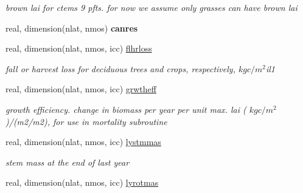 \begin{DoxyCompactItemize}
\begin{DoxyCompactList}\small\item\em brown lai for ctem\textquotesingle{}s 9 pfts. for now we assume only grasses can have brown lai \end{DoxyCompactList}\item 
\hypertarget{structctem__statevars_1_1veg__rot_abd9cd2795117223b9d3d97be030f8e0b}{}real, dimension(nlat, nmos) {\bfseries canres}\label{structctem__statevars_1_1veg__rot_abd9cd2795117223b9d3d97be030f8e0b}

\item 
\hypertarget{structctem__statevars_1_1veg__rot_a691b3864630e729cb3e2b7675c283796}{}real, dimension(nlat, nmos, icc) \hyperlink{structctem__statevars_1_1veg__rot_a691b3864630e729cb3e2b7675c283796}{flhrloss}\label{structctem__statevars_1_1veg__rot_a691b3864630e729cb3e2b7675c283796}

\begin{DoxyCompactList}\small\item\em fall or harvest loss for deciduous trees and crops, respectively, $kg c/m^2$il1 \end{DoxyCompactList}\item 
\hypertarget{structctem__statevars_1_1veg__rot_a65c8792a7c6ae4f66f2c7ceca24e4ada}{}real, dimension(nlat, nmos, icc) \hyperlink{structctem__statevars_1_1veg__rot_a65c8792a7c6ae4f66f2c7ceca24e4ada}{grwtheff}\label{structctem__statevars_1_1veg__rot_a65c8792a7c6ae4f66f2c7ceca24e4ada}

\begin{DoxyCompactList}\small\item\em growth efficiency. change in biomass per year per unit max. lai ( $kg c/m^2$)/(m2/m2), for use in mortality subroutine \end{DoxyCompactList}\item 
\hypertarget{structctem__statevars_1_1veg__rot_a01ef55090edca062f3c113e28af87250}{}real, dimension(nlat, nmos, icc) \hyperlink{structctem__statevars_1_1veg__rot_a01ef55090edca062f3c113e28af87250}{lystmmas}\label{structctem__statevars_1_1veg__rot_a01ef55090edca062f3c113e28af87250}

\begin{DoxyCompactList}\small\item\em stem mass at the end of last year \end{DoxyCompactList}\item 
\hypertarget{structctem__statevars_1_1veg__rot_a00b8b83ddfdbc8cbd74dd36aec8191ea}{}real, dimension(nlat, nmos, icc) \hyperlink{structctem__statevars_1_1veg__rot_a00b8b83ddfdbc8cbd74dd36aec8191ea}{lyrotmas}\label{structctem__statevars_1_1veg__rot_a00b8b83ddfdbc8cbd74dd36aec8191ea}


\end{DoxyCompactItemize}
